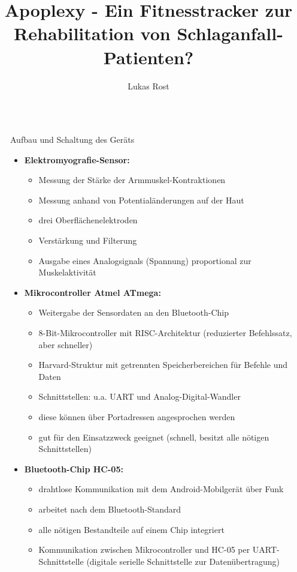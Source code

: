 \documentclass[final,20pt]{beamer}
\title{Apoplexy - Ein Fitnesstracker zur Rehabilitation von Schlaganfall-Patienten?}
\author{Lukas Rost}
\institute{Albert-Schweitzer-Gymnasium Erfurt}
\newlength{\sepwidth}
\newlength{\colwidth}
\newcommand{\separatorcolumn}{\begin{column}{\sepwidth}\end{column}}
\begin{document}
\begin{frame}[t]
\begin{columns}[t]
\separatorcolumn

\begin{column}{\colwidth}
   \begin{alertblock}{Aufbau und Schaltung des Geräts}
  	\begin{itemize}
  		\item \textbf{Elektromyografie-Sensor:}
  		\begin{itemize}
  			\item Messung der Stärke der Armmuskel-Kontraktionen
  			\item Messung anhand von Potentialänderungen auf der Haut
  			\item drei Oberflächenelektroden
  			\item Verstärkung und Filterung
  			\item Ausgabe eines Analogsignals (Spannung) proportional zur Muskelaktivität
  		\end{itemize}
  		\item \textbf{Mikrocontroller Atmel ATmega:}
  		\begin{itemize}
  			\item Weitergabe der Sensordaten an den Bluetooth-Chip
  			\item 8-Bit-Mikrocontroller mit RISC-Architektur (reduzierter Befehlssatz, aber schneller)
  			\item Harvard-Struktur mit getrennten Speicherbereichen für Befehle und Daten
  			\item Schnittstellen: u.a. UART und Analog-Digital-Wandler
  			\item diese können über Portadressen angesprochen werden
  			\item gut für den Einsatzzweck geeignet (schnell, besitzt alle nötigen Schnittstellen)
  		\end{itemize}
  		\item \textbf{Bluetooth-Chip HC-05:}
  		\begin{itemize}
  			\item drahtlose Kommunikation mit dem Android-Mobilgerät über Funk 
  			\item arbeitet nach dem Bluetooth-Standard
  			\item alle nötigen Bestandteile auf einem Chip integriert
  			\item Kommunikation zwischen Mikrocontroller und HC-05 per UART-Schnittstelle (digitale serielle Schnittstelle zur Datenübertragung)

\end{itemize}
\end{itemize}
\end{alertblock}
\end{column}
\end{columns}
\end{frame}
\end{document}
